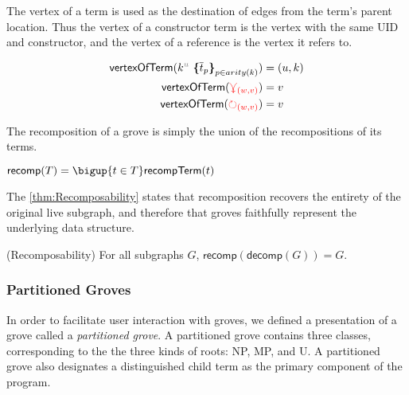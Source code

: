 The vertex of a term is used as the destination of edges from the term's parent location. Thus the vertex of a constructor term is the vertex with the same UID and constructor, and the vertex of a reference is the vertex it refers to. 

\begin{definition}
    \begin{align*}
    \mathsf{vertexOfTerm}(\genericTerm{u}{\subtermMV_p}) &= (u,k)\\
    \mathsf{vertexOfTerm}(\multiref) &= v\\
    \mathsf{vertexOfTerm}(\uniref) &= v
    \end{align*}
\end{definition}    


The recomposition of a grove is simply the union of the recompositions of its terms.

\begin{definition}
    $\mathsf{recomp}(T) = \bigup{\termMV \in T}\mathsf{recompTerm}(\termMV)$
\end{definition}

The \autoref{thm:Recomposability} states that recomposition recovers the entirety of the original live subgraph, and therefore that groves faithfully represent the underlying data structure.

\begin{theorem}
\label{thm:Recomposability}
    (Recomposability) For all subgraphs $G$, $\mathsf{recomp}(\mathsf{decomp}(G))=G$.
\end{theorem}

\subsubsection{Partitioned Groves}

In order to facilitate user interaction with groves, we defined a presentation of a grove called a \textit{partitioned grove}. A partitioned grove contains three classes, corresponding to the the three kinds of roots: NP, MP, and U. A partitioned grove also designates a distinguished child term as the primary component of the program.

